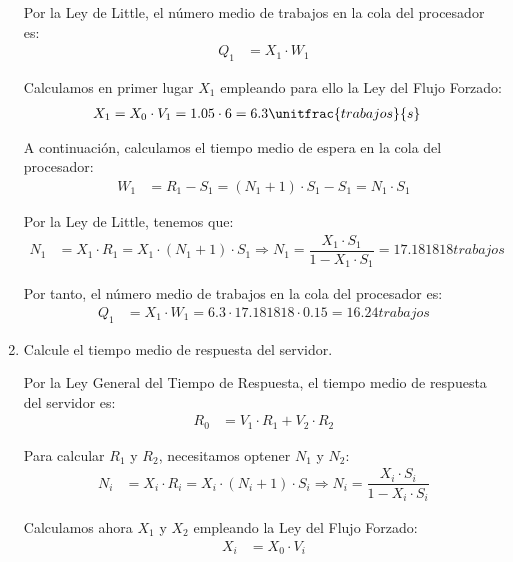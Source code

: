 \begin{ejercicio}
\begin{enumerate}
        Por la Ley de Little, el número medio de trabajos en la cola del procesador es:
        \begin{align*}
            Q_1 &= X_1 \cdot W_1
        \end{align*}

        Calculamos en primer lugar $X_1$ empleando para ello la Ley del Flujo Forzado:
        \begin{align*}
            X_1 &= X_0 \cdot V_1 = 1.05 \cdot 6 = 6.3 \unitfrac{trabajos}{s}
        \end{align*}

        A continuación, calculamos el tiempo medio de espera en la cola del procesador:
        \begin{align*}
            W_1 &= R_1 - S_1 = (N_1 + 1) \cdot S_1 - S_1 = N_1 \cdot S_1
        \end{align*}

        Por la Ley de Little, tenemos que:
        \begin{align*}
            N_1 &= X_1 \cdot R_1
            = X_1 \cdot (N_1 + 1) \cdot S_1
            \Longrightarrow N_1 = \dfrac{X_1 \cdot S_1}{1 - X_1 \cdot S_1}
            = 17.181818 \unit{trabajos}
        \end{align*}

        Por tanto, el número medio de trabajos en la cola del procesador es:
        \begin{align*}
            Q_1 &= X_1 \cdot W_1 = 6.3 \cdot 17.181818 \cdot 0.15 = 16.24 \unit{trabajos}
        \end{align*}
        \item Calcule el tiempo medio de respuesta del servidor.
        
        Por la Ley General del Tiempo de Respuesta, el tiempo medio de respuesta del servidor es:
        \begin{align*}
            R_0 &= V_1 \cdot R_1 + V_2 \cdot R_2
        \end{align*}

        Para calcular $R_1$ y $R_2$, necesitamos optener $N_1$ y $N_2$:
        \begin{align*}
            N_i &= X_i \cdot R_i
            = X_i \cdot (N_i + 1) \cdot S_i
            \Longrightarrow N_i = \dfrac{X_i \cdot S_i}{1 - X_i \cdot S_i}
        \end{align*}

        Calculamos ahora $X_1$ y $X_2$ empleando la Ley del Flujo Forzado:
        \begin{align*}
            X_i &= X_0 \cdot V_i
        \end{align*}


\end{enumerate}
\end{ejercicio}
